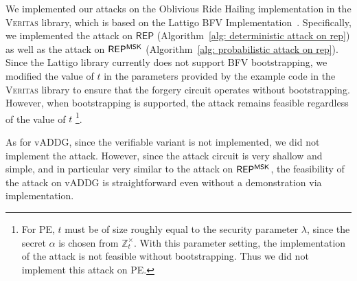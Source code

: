 \documentclass[runningheads]{llncs}
\newcommand{\REP}{\textsf{REP}{}}
\newcommand{\PE}{\textsf{PE}{}}
\begin{document}
We implemented our attacks on the Oblivious Ride Hailing implementation in the \textsc{Veritas} library, which is based on the Lattigo BFV Implementation~\cite{Lattigo}. Specifically, we implemented the attack on $\REP$ (Algorithm~\ref{alg: deterministic attack on rep}) as well as the attack on $\REP^{\sf MSK}$ (Algorithm~\ref{alg: probabilistic attack on rep}). Since the Lattigo library currently does not support BFV bootstrapping, we modified the value of $t$ in the parameters provided by the example code in the \textsc{Veritas} library to ensure that the forgery circuit operates without bootstrapping. However, when bootstrapping is supported, the attack remains feasible regardless of the value of $t$
\footnote{For \PE, \(t\) must be of size roughly equal to the security parameter \(\lambda\), since the secret \(\alpha\) is chosen from \(\mathbb{Z}_t^\times\). With this parameter setting, the implementation of the attack is not feasible without bootstrapping. Thus we did not implement this attack on \PE.}.

As for vADDG, since the verifiable variant is not implemented, we did not implement the attack. However, since the attack circuit is very shallow and simple, and in particular very similar to the attack on $\REP^{\sf MSK}$, the feasibility of the attack on vADDG is straightforward even without a demonstration via implementation. 
 
\end{document}
